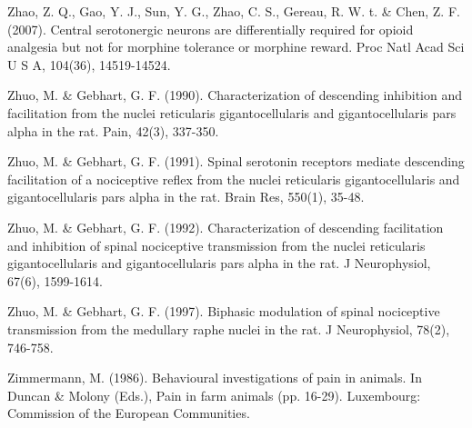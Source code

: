 \documentclass[a4paper,12pt,twoside]{report}
\begin{document}
\begin{singlespacing}
\begin{footnotesize}
Zhao, Z. Q., Gao, Y. J., Sun, Y. G., Zhao, C. S., Gereau, R. W. t. \& Chen, Z. F. (2007). Central serotonergic neurons are differentially required for opioid analgesia but not for morphine tolerance or morphine reward. Proc Natl Acad Sci U S A, 104(36), 14519-14524.

Zhuo, M. \& Gebhart, G. F. (1990). Characterization of descending inhibition and facilitation from the nuclei reticularis gigantocellularis and gigantocellularis pars alpha in the rat. Pain, 42(3), 337-350.

Zhuo, M. \& Gebhart, G. F. (1991). Spinal serotonin receptors mediate descending facilitation of a nociceptive reflex from the nuclei reticularis gigantocellularis and gigantocellularis pars alpha in the rat. Brain Res, 550(1), 35-48.

Zhuo, M. \& Gebhart, G. F. (1992). Characterization of descending facilitation and inhibition of spinal nociceptive transmission from the nuclei reticularis gigantocellularis and gigantocellularis pars alpha in the rat. J Neurophysiol, 67(6), 1599-1614.

Zhuo, M. \& Gebhart, G. F. (1997). Biphasic modulation of spinal nociceptive transmission from the medullary raphe nuclei in the rat. J Neurophysiol, 78(2), 746-758.

Zimmermann, M. (1986). Behavioural investigations of pain in animals. In Duncan \& Molony (Eds.), Pain in farm animals (pp. 16-29). Luxembourg: Commission of the European Communities.

\end{footnotesize}
\end{singlespacing}

\onecolumn

\fancyhf{} %
\renewcommand{\headrulewidth}{0pt}
\renewcommand{\footrulewidth}{0pt}
\addtolength{\headheight}{0pt}

\setlength{\parindent}{0cm}
\singlespacing
\end{document}
